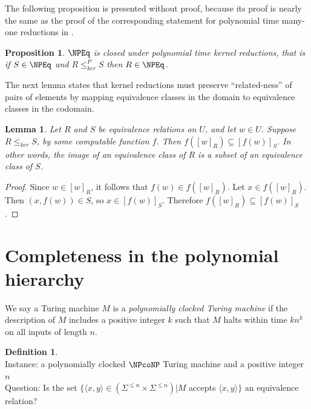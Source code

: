 \documentclass[draft]{article}
\newtheorem{lemma}[lemma]{Lemma}
\newtheorem{proposition}[proposition]{Proposition}
\theoremstyle{definition} \newtheorem{openproblem}[openproblem]{Open problem}
\theoremstyle{definition} \newtheorem{definition}[definition]{Definition}
\theoremstyle{remark} \newtheorem{remark}[remark]{Remark}
\newcommand{\kr}{\leq^{P}_{ker}} %
\newcommand{\krnt}{\leq_{ker}} %
\newcommand{\defn}[1]{\emph{#1}} %
\newcommand{\pair}[2]{\langle#1,#2\rangle} %
\newenvironment{langdef}[1]{\begin{definition}{\lang{#1}}}{\end{definition}}
\newenvironment{instance}{\\Instance:}{}
\newenvironment{question}{\\Question:}{}
\begin{document}

The following proposition is presented without proof, because its proof is nearly the same as the proof of the corresponding statement for polynomial time many-one reductions in \NP.

\begin{proposition}\label{prop:closed_under_kr}
  $\NPEq$ is closed under polynomial time kernel reductions, that is if $S\in\NPEq$ and $R\kr S$ then $R\in\NPEq$.
\end{proposition}

The next lemma states that kernel reductions must preserve ``related-ness'' of pairs of elements by mapping equivalence classes in the domain to equivalence classes in the codomain.

\begin{lemma}\label{lem:image}
  Let $R$ and $S$ be equivalence relations on $U$, and let $w\in U$.
  Suppose $R\krnt S$, by some computable function $f$.
  Then $f([w]_R)\subseteq [f(w)]_S$.
  In other words, the image of an equivalence class of $R$ is a subset of an equivalence class of $S$.
\end{lemma}
\begin{proof}
  Since $w\in [w]_R$, it follows that $f(w)\in f([w]_R)$.
  Let $x\in f([w]_R)$.
  Then $(x, f(w))\in S$, so $x\in [f(w)]_S$.
  Therefore $f([w]_R)\subseteq [f(w)]_S$.
\end{proof}

\section{Completeness in the polynomial hierarchy}

We say a Turing machine $M$ is a \defn{polynomially clocked Turing machine} if the description of $M$ includes a positive integer $k$ such that $M$ halts within time $kn^k$ on all inputs of length $n$.

\begin{langdef}{EQUIV}
  \begin{instance}
    a polynomially clocked $\NPcoNP$ Turing machine and a positive integer $n$
  \end{instance}
  \begin{question}
    Is the set $\{\pair{x}{y}\in(\Sigma^{\leq n}\times\Sigma^{\leq n})|M$ accepts $\pair{x}{y}\}$ an equivalence relation?
  \end{question}
\end{langdef}
\end{document}
